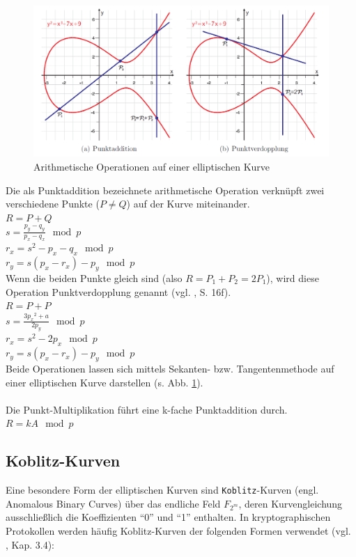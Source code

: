 \begin{figure}[H]
	\centering
	\includegraphics[width=\textwidth]{bilder/p-addition}
	\caption{Arithmetische Operationen auf einer elliptischen Kurve}
	\label{fig:padd}
\end{figure}

Die als Punktaddition bezeichnete arithmetische Operation verknüpft zwei verschiedene Punkte ($P \ne Q$) auf der Kurve miteinander. \\

$R = P + Q$ \\
$s = \frac{p_y-q_y}{p_x-q_x} \mod p$ \\
$r_x = s^2 - p_x - q_x \mod p$ \\
$r_y = s(p_x-r_x)-p_y \mod p$ \\

Wenn die beiden Punkte gleich sind (also $R = P_1 + P_2 = 2 P_1$), wird diese Operation Punktverdopplung genannt (vgl. \cite{puttmann}, S. 16f). \\

$R=P+P$ \\
$s=\frac{3{p_x}^2+a}{2p_y} \mod p$ \\  
$r_x=s^2-2p_x \mod p$ \\  
$r_y=s(p_x-r_x)-p_y \mod p$ \\

Beide Operationen lassen sich mittels Sekanten- bzw. Tangentenmethode auf einer elliptischen Kurve darstellen (s. Abb. \ref{fig:padd}). 
\\ \\
Die Punkt-Multiplikation führt eine k-fache Punktaddition durch. \\

$R = k A \mod p$

\subsection{Koblitz-Kurven}
Eine besondere Form der elliptischen Kurven sind \texttt{Koblitz}-Kurven (engl. Anomalous Binary Curves) über das endliche Feld $F_{2^m}$, deren Kurvengleichung ausschließlich die Koeffizienten ``0'' und ``1'' enthalten. In kryptographischen Protokollen werden häufig Koblitz-Kurven der folgenden Formen verwendet (vgl. \cite{guide}, Kap. 3.4):

